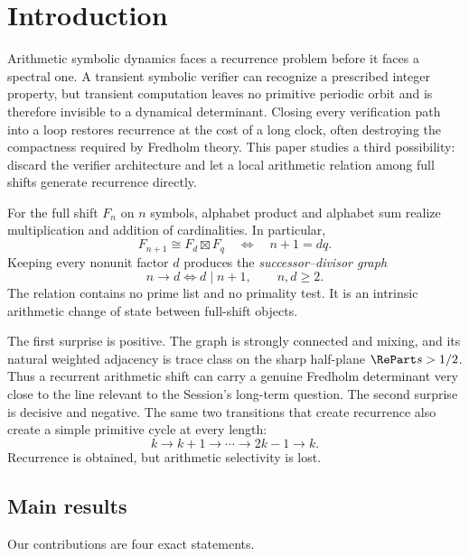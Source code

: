\section{Introduction}
\label{sec:introduction}

Arithmetic symbolic dynamics faces a recurrence problem before it faces a
spectral one.  A transient symbolic verifier can recognize a prescribed
integer property, but transient computation leaves no primitive periodic
orbit and is therefore invisible to a dynamical determinant.  Closing every
verification path into a loop restores recurrence at the cost of a long
clock, often destroying the compactness required by Fredholm theory.  This
paper studies a third possibility: discard the verifier architecture and let
a local arithmetic relation among full shifts generate recurrence directly.

For the full shift \(F_n\) on \(n\) symbols, alphabet product and alphabet
sum realize multiplication and addition of cardinalities.  In particular,
\[
 F_{n+1}\cong F_d\boxtimes F_q
 \quad\Longleftrightarrow\quad
 n+1=dq.
\]
Keeping every nonunit factor \(d\) produces the
\emph{successor--divisor graph}
\[
 n\to d\iff d\mid n+1,\qquad n,d\ge2.
\]
The relation contains no prime list and no primality test.  It is an
intrinsic arithmetic change of state between full-shift objects.

The first surprise is positive.  The graph is strongly connected and mixing,
and its natural weighted adjacency is trace class on the sharp half-plane
\(\RePart s>1/2\).  Thus a recurrent arithmetic shift can carry a genuine
Fredholm determinant very close to the line relevant to the Session's
long-term question.  The second surprise is decisive and negative.  The same
two transitions that create recurrence also create a simple primitive cycle
at every length:
\[
 k\to k+1\to\cdots\to2k-1\to k.
\]
Recurrence is obtained, but arithmetic selectivity is lost.

\subsection{Main results}

Our contributions are four exact statements.

